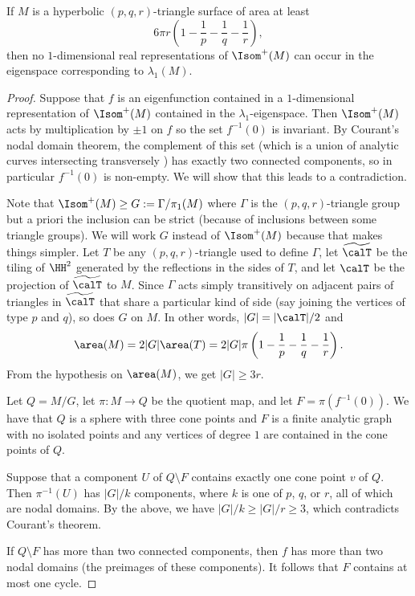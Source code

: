 \documentclass[12pt]{amsart}
\numberwithin{equation}{section}
\begin{document}
\begin{lem} \label{lem:no1rep}
If $M$ is a hyperbolic $(p,q,r)$-triangle surface of area at least \[6\pi r \left(1 -\frac1p - \frac1q - \frac1r \right),\] then no $1$-dimensional real representations of $\Isom^+(M)$ can occur in the eigenspace corresponding to $\lambda_1(M)$.
\end{lem}
\begin{proof}
Suppose that $f$ is an eigenfunction contained in a $1$-dimensional representation of $\Isom^+(M)$ contained in the $\lambda_1$-eigenspace. Then $\Isom^+(M)$ acts by multiplication by $\pm 1$ on $f$ so the set $f^{-1}(0)$ is invariant. By Courant's nodal domain theorem, the complement of this set (which is a union of analytic curves intersecting transversely \cite{ChengMultiplicity}) has exactly two connected components, so in particular $f^{-1}(0)$ is non-empty. We will show that this leads to a contradiction.

Note that $\Isom^+(M) \geq G : = \Gamma / \pi_1(M)$ where $\Gamma$ is the $(p,q,r)$-triangle group but a priori the inclusion can be strict (because of inclusions between some triangle groups). We will work $G$ instead of $\Isom^+(M)$ because that makes things simpler. Let $T$ be any $(p,q,r)$-triangle used to define $\Gamma$, let $\widetilde\calT$ be the tiling of $\HH^2$ generated by the reflections in the sides of $T$, and let $\calT$ be the projection of $\widetilde \calT$ to $M$. Since $\Gamma$ acts simply transitively on adjacent pairs of triangles in $\widetilde \calT$ that share a particular kind of side (say joining the vertices of type $p$ and $q$), so does $G$ on $M$. In other words, $|G| = |\calT| / 2$ and
\[\area(M) = 2|G| \area(T)= 2|G| \pi\left(1 - \frac1p - \frac1q - \frac1r \right).\] From the hypothesis on $\area(M)$, we get $|G|\geq 3r$.

Let $Q = M/G$, let $\pi: M \to Q$ be the quotient map, and let $F = \pi(f^{-1}(0))$. We have that $Q$ is a sphere with three cone points and $F$ is a finite analytic graph with no isolated points and any vertices of degree $1$ are contained in the cone points of $Q$.

Suppose that a component $U$ of $Q \setminus F$ contains exactly one cone point $v$ of $Q$. Then $\pi^{-1}(U)$ has $|G|/k$ components, where $k$ is one of $p$, $q$, or $r$, all of which are nodal domains. By the above, we have $|G|/k \geq |G|/r \geq 3$, which contradicts Courant's theorem.

If $Q \setminus F$ has more than two connected components, then $f$ has more than two nodal domains (the preimages of these components). It follows that $F$ contains at most one cycle. 


\end{proof}
\end{document}
